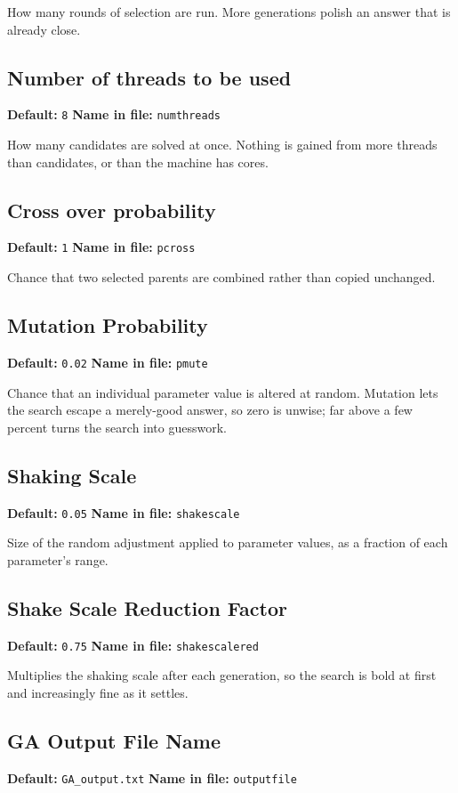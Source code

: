 \documentclass[11pt]{article}
\begin{document}
How many rounds of selection are run. More generations polish an answer that is already close.
\subsection{Number of threads to be used}
{\small \textbf{Default:} \texttt{8} \quad\textbullet\quad \textbf{Name in file:} \texttt{numthreads}}

How many candidates are solved at once. Nothing is gained from more threads than candidates, or than the machine has cores.
\subsection{Cross over probability}
{\small \textbf{Default:} \texttt{1} \quad\textbullet\quad \textbf{Name in file:} \texttt{pcross}}

Chance that two selected parents are combined rather than copied unchanged.
\subsection{Mutation Probability}
{\small \textbf{Default:} \texttt{0.\allowbreak{}02} \quad\textbullet\quad \textbf{Name in file:} \texttt{pmute}}

Chance that an individual parameter value is altered at random. Mutation lets the search escape a merely-good answer, so zero is unwise; far above a few percent turns the search into guesswork.
\subsection{Shaking Scale}
{\small \textbf{Default:} \texttt{0.\allowbreak{}05} \quad\textbullet\quad \textbf{Name in file:} \texttt{shakescale}}

Size of the random adjustment applied to parameter values, as a fraction of each parameter's range.
\subsection{Shake Scale Reduction Factor}
{\small \textbf{Default:} \texttt{0.\allowbreak{}75} \quad\textbullet\quad \textbf{Name in file:} \texttt{shakescalered}}

Multiplies the shaking scale after each generation, so the search is bold at first and increasingly fine as it settles.
\subsection{GA Output File Name}
{\small \textbf{Default:} \texttt{GA\_\allowbreak{}output.\allowbreak{}txt} \quad\textbullet\quad \textbf{Name in file:} \texttt{outputfile}}
\end{document}
